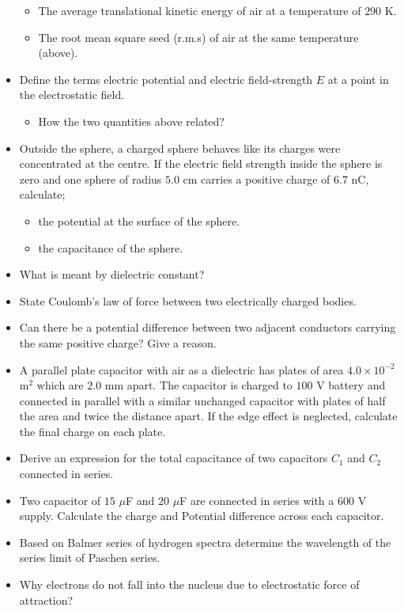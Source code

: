 \documentclass{article}
\begin{document}
\begin{itemize}
 \begin{itemize}
\item The average translational kinetic energy of air at a temperature of $ 290$ K.
\item The root mean square seed (r.m.s) of air at the same temperature (above).
\end{itemize}
\item Define the terms electric potential and electric field-strength $ E$ at a point in the electrostatic field.
 \begin{itemize}
\item How the two quantities above related? 
\end{itemize}
\item Outside the sphere, a charged sphere behaves like its charges were concentrated at the centre. If the electric field strength inside the sphere is zero and one sphere of radius $ 5.0$ cm carries a positive charge of $ 6.7$ nC, calculate; 
 \begin{itemize}
\item the potential at the surface of the sphere. 
\item the capacitance of the sphere. 
\end{itemize}
\item What is meant by dielectric constant? 
\item State Coulomb’s law of force between two electrically charged bodies. 
\item Can there be a potential difference between two adjacent conductors carrying the same positive charge? Give a reason. 
\item A parallel plate capacitor with air as a dielectric has plates of area $ 4.0 \times 10^{-2}$ m$ ^{2}$ which are $ 2.0$ mm apart. The capacitor is charged to $ 100$ V battery and connected in parallel with a similar unchanged capacitor with plates of half the area and twice the distance apart. If the edge effect is neglected, calculate the final charge on each plate. 
\item Derive an expression for the total capacitance of two capacitors $ C_{1}$ and $ C_{2}$ connected in series. 
\item Two capacitor of $ 15$ $\mu$F and $ 20$ $\mu$F are connected in series with a $ 600$ V supply.  Calculate the charge and Potential difference across each capacitor. 
\item Based on Balmer series of hydrogen spectra determine the wavelength of the series limit of Paschen series. 
\item Why electrons do not fall into the nucleus due to electrostatic force of attraction?

\end{itemize}
\end{document}
